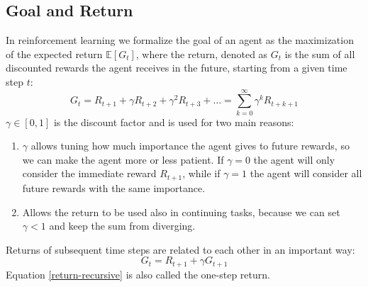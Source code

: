 \subsection{Goal and Return}
In reinforcement learning we formalize the goal of an agent as the maximization of the expected return $\mathbb{E}[G_t]$, where the return, denoted as $G_t$ is the sum of all discounted rewards the agent receives in the future, starting from a given time step $t$:
\begin{equation}
    G_t = R_{t+1} + \gamma R_{t+2} + \gamma^2 R_{t+3} + \dots = \sum_{k=0}^{\infty} \gamma^k R_{t+k+1}
    \label{return}
\end{equation}
$\gamma \in [0, 1]$ is the discount factor and is used for two main reasons:
\begin{enumerate}
    \item $\gamma$ allows tuning how much importance the agent gives to future rewards, so we can make the agent more or less patient. If $\gamma = 0$ the agent will only consider the immediate reward $R_{t+1}$, while if $\gamma = 1$ the agent will consider all future rewards with the same importance.
    \item Allows the return to be used also in continuing tasks, because we can set $\gamma < 1$ and keep the sum from diverging.
\end{enumerate}
Returns of subsequent time steps are related to each other in an important way:
\begin{equation}
    G_t = R_{t+1} + \gamma G_{t+1}
    \label{return-recursive}
\end{equation}
Equation \eqref{return-recursive} is also called the one-step return.

